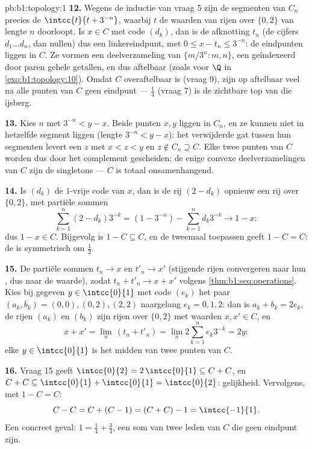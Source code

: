 \begin{solution}{pb:b1:topology:1}
\textbf{12.} Wegens de inductie van vraag 5 zijn de segmenten van $C_n$
precies de $\intcc{t}{t + 3^{-n}}$, waarbij $t$ de waarden van rijen over
$\{0,2\}$ van lengte $n$ doorloopt. Is $x \in C$ met code $(d_k)$, dan is
de afknotting $t_n$ (de cijfers $d_1 \dots d_n$, dan nullen) dus een
linkereindpunt, met $0 \leq x - t_n \leq 3^{-n}$: de eindpunten liggen
 in $C$. Ze vormen een deelverzameling van $\{m/3^n : m, n\}$, een
 geïndexeerd door paren gehele getallen, en dus aftelbaar
(zoals voor $\Q$ in \cref{exo:b1:topology:10}). Omdat $C$ overaftelbaar
is (vraag 9), zijn op aftelbaar veel na alle punten van $C$ geen
eindpunt --- $\frac14$ (vraag 7) is de zichtbare top van die ijsberg.

\textbf{13.} Kies $n$ met $3^{-n} < y - x$. Beide punten $x, y$ liggen in
$C_n$, en ze kunnen niet in hetzelfde segment liggen (lengte $3^{-n} < y
- x$): het verwijderde gat tussen hun segmenten levert een $z$ met $x < z
< y$ en $z \notin C_n \supseteq C$. Elke twee punten van $C$ worden dus
door het complement gescheiden: de enige convexe deelverzamelingen van
$C$ zijn de singletons --- $C$ is totaal onsamenhangend.

\textbf{14.} Is $(d_k)$ de $1$-vrije code van $x$, dan is de rij $(2 -
d_k)$ opnieuw een rij over $\{0,2\}$, met partiële sommen
\[
\sum_{k=1}^{n} (2 - d_k)3^{-k} = (1 - 3^{-n}) - \sum_{k=1}^n
d_k 3^{-k} \longrightarrow 1 - x :
\]
dus $1 - x \in C$. Bijgevolg is $1 - C \subseteq C$, en de 
tweemaal toepassen geeft $1 - C = C$: de  is symmetrisch
om $\frac12$.

\textbf{15.} De partiële sommen $t_n \to x$ en $t'_n \to x'$ (stijgende
rijen convergeren naar hun , dus naar de waarde), zodat $t_n +
t'_n \to x + x'$ volgens \cref{thm:b1:seq:operations}. Kies bij gegeven
$y \in \intcc{0}{1}$ met code $(e_k)$ het paar $(a_k, b_k) = (0,0),
(0,2), (2,2)$ naargelang $e_k = 0, 1, 2$: dan is $a_k + b_k = 2e_k$, de
rijen $(a_k)$ en $(b_k)$ zijn rijen over $\{0,2\}$ met waarden $x, x' \in
C$, en
\[
x + x' = \lim_n\,(t_n + t'_n) = \lim_n 2\sum_{k=1}^n e_k 3^{-k}
= 2y :
\]
elke $y \in \intcc{0}{1}$ is het midden van twee punten van $C$.

\textbf{16.} Vraag 15 geeft $\intcc{0}{2} = 2\,\intcc{0}{1} \subseteq C +
C$, en $C + C \subseteq \intcc{0}{1} + \intcc{0}{1} = \intcc{0}{2}$:
gelijkheid. Vervolgens, met $1 - C = C$:
\[
C - C = C + (C - 1) = (C + C) - 1 = \intcc{-1}{1} .
\]
Een concreet geval: $1 = \frac14 + \frac34$, een som van twee leden van
$C$ die geen eindpunt zijn.


\end{solution}
